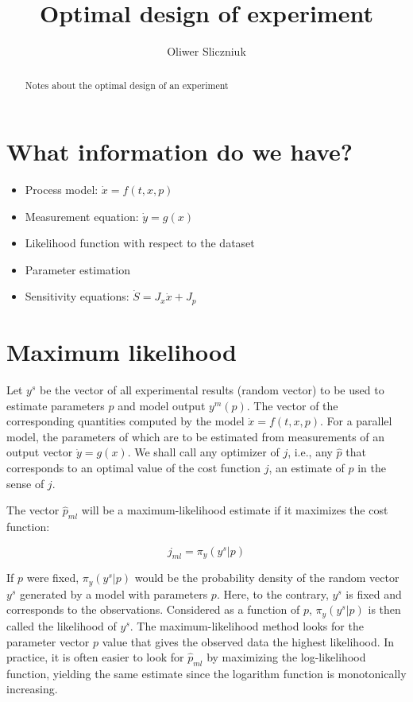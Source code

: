 \documentclass[]{scrartcl}
\title{Optimal design of experiment}
\author{Oliwer Sliczniuk}
\begin{document}
\maketitle

\begin{abstract}
Notes about the optimal design of an experiment
\end{abstract}

\section{What information do we have?}

\begin{itemize}
	\item Process model: $\dot{x}=f(t,x,p)$
	\item Measurement equation: $\dot{y}=g(x)$
	\item Likelihood function with respect to the dataset
	\item Parameter estimation
	\item Sensitivity equations: $\dot{S} = J_x \dot{x} + J_p$
\end{itemize}

\section{Maximum likelihood}
Let $y^s$ be the vector of all experimental results (random vector) to be used to estimate parameters $p$ and model output $y^m(p)$. The vector of the corresponding quantities computed by the model $\dot{x}=f(t,x,p)$. For a parallel model, the parameters of which are to be estimated from measurements of an output vector $\dot{y}=g(x)$. We shall call any optimizer of $j$, i.e., any $\hat{p}$ that corresponds to an optimal value of the cost function $j$, an estimate of $p$ in the sense of $j$.

The vector $\hat{p}_{ml}$ will be a maximum-likelihood estimate if it maximizes the cost function:

\begin{equation}
	j_{ml} = \pi_y (y^s|p) 
\end{equation}

If $p$ were fixed, $\pi_y(y^s|p)$ would be the probability density of the random vector $y^s$ generated by a model with parameters $p$. Here, to the contrary, $y^s$ is fixed and corresponds to the observations. Considered as a function of $p$, $\pi_y(y^s|p)$ is then called the likelihood of $y^s$. The maximum-likelihood method looks for the parameter vector $p$ value that gives the observed data the highest likelihood. In practice, it is often easier to look for $\hat{p}_{ml}$ by maximizing the log-likelihood function, yielding the same estimate since the logarithm function is monotonically increasing.
\end{document}
